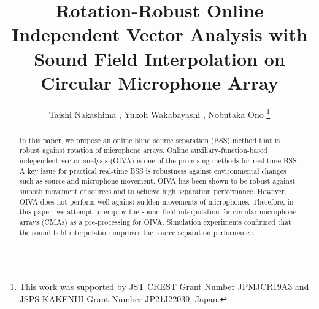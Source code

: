 \documentclass[twocolumn,9pt,dvipdfmx]{article}
\title{Rotation-Robust Online Independent Vector Analysis with\\Sound Field Interpolation on Circular Microphone Array}
\author{%
  Taishi Nakashima \textsuperscript{\textdagger},
  Yukoh Wakabayashi \textsuperscript{\textdaggerdbl},
  Nobutaka Ono \textsuperscript{\textdagger}
  \thanks{This work was supported by JST CREST Grant Number \mbox{JPMJCR19A3} and JSPS KAKENHI Grant Number \mbox{JP21J22039}, Japan.}
}
\begin{document}
\maketitle

\begin{abstract}
  In this paper, we propose an online blind source separation (BSS) method that is robust against rotation of microphone arrays.
  Online auxiliary-function-based independent vector analysis (OIVA) is one of the promising methods for real-time BSS.
  A key issue for practical real-time BSS is robustness against environmental changes such as source and microphone movement.
  OIVA has been shown to be robust against smooth movement of sources and to achieve high separation performance.
  However, OIVA does not perform well against sudden movements of microphones.
  Therefore, in this paper, we attempt to employ the sound field interpolation for circular microphone arrays (CMAs) as a pre-processing for OIVA.
  Simulation experiments confirmed that the sound field interpolation improves the source separation performance.
\end{abstract}
\end{document}
